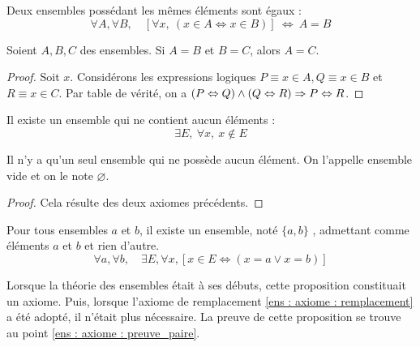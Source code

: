 \begin{axiome}[d'extensionnalité]\label{ens : axiome : ext}
	Deux ensembles possédant les mêmes éléments sont égaux :
	\begin{equation*}
		\forall A,\forall B, \quad [\forall x, \: (x\in A \Leftrightarrow x\in B)] \: \Leftrightarrow \:A=B
	\end{equation*}
\end{axiome}
\begin{proposition}\label{ens : axiome : transi_égalité}
    Soient $A,B,C$ des ensembles. Si $A = B$ et $B=C$, alors $A=C$.
\end{proposition}
\begin{proof}
Soit $x$.
Considérons les expressions logiques $P\equiv x\in A, Q\equiv x\in B$ et $R\equiv x\in C$.
 Par table de vérité, on a $(P\Leftrightarrow Q)\land(Q\Leftrightarrow R)\Rightarrow P\Leftrightarrow R$.
\end{proof}
\begin{axiome}\label{ens : axiome ; vide}
	Il existe un ensemble qui ne contient aucun éléments :
	\begin{equation*}
		\exists E,\: \forall x,\: x\notin E
	\end{equation*}
\end{axiome}

\begin{proposition}
	Il n'y a qu'un seul ensemble qui ne possède aucun élément.
	On l'appelle ensemble vide et on le note $\varnothing$.
\end{proposition}

\begin{proof}
	Cela résulte des deux axiomes précédents.
\end{proof}
\begin{proposition}\label{ens : axiome : paire}
	Pour tous ensembles $a$ et $b$, il existe un ensemble, noté $\{a,b\}$
	, admettant comme éléments $a$ et $b$ et rien d'autre.
	\begin{equation*}
		\forall a,\forall b,\quad \exists E,\forall x, [x\in E \Leftrightarrow (x=a \lor x=b)]
	\end{equation*}
\end{proposition}
\begin{remarque}
Lorsque la théorie des ensembles était à ses débuts, cette proposition constituait un axiome. Puis, lorsque l'axiome de remplacement \ref{ens : axiome : remplacement} a été adopté, il n'était plus nécessaire. La preuve de cette proposition se trouve au point \ref{ens : axiome : preuve_paire}.
\end{remarque}

